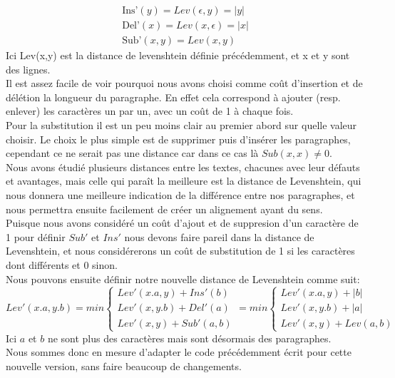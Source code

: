 \documentclass{article}
\begin{document}
\begin{gather*}
	\text{Ins'}(y) = Lev(\epsilon,y) = \lvert y \rvert\\
	\text{Del'}(x) = Lev(x,\epsilon) = \lvert x \rvert\\
	\text{Sub'}(x,y) = Lev(x,y)
\end{gather*}
Ici Lev(x,y) est la distance de levenshtein définie précédemment, et x et y
sont des lignes.\\

Il est assez facile de voir pourquoi nous avons choisi comme coût d'insertion
et de délétion la longueur du paragraphe. En effet cela correspond à ajouter
(resp. enlever) les caractères un par un, avec un coût de 1 à chaque fois.\\

Pour la substitution il est un peu moins clair au premier abord sur quelle
valeur choisir. Le choix le plus simple est de supprimer puis d'insérer les
paragraphes, cependant ce ne serait pas une distance car dans ce cas là
$Sub(x,x) \neq 0$.\\
Nous avons étudié plusieurs distances entre les textes, chacunes avec leur
défauts et avantages, mais celle qui paraît la meilleure est la distance de
Levenshtein, qui nous donnera une meilleure indication de la différence entre
nos paragraphes, et nous permettra ensuite facilement de créer un alignement
ayant du sens.\\
Puisque nous avons considéré un coût d'ajout et de suppresion d'un caractère de
1 pour définir $Sub'$ et $Ins'$ nous devons faire pareil dans la distance de
Levenshtein, et nous considérerons un coût de substitution de 1 si les
caractères dont différents et 0 sinon.\\

Nous pouvons ensuite définir notre nouvelle distance de Levenshtein comme suit:
\begin{equation*}
	Lev'(x.a,y.b)= min
		\begin{cases}
			Lev'(x.a,y) + Ins'(b)\\
			Lev'(x,y.b) + Del'(a)\\
			Lev'(x,y) + Sub'(a,b)
		\end{cases}
		= min
		\begin{cases}
			Lev'(x.a,y) + \lvert b \rvert\\
			Lev'(x,y.b) + \lvert a \rvert\\
			Lev'(x,y) + Lev(a,b)
		\end{cases}
\end{equation*}
Ici $a$ et $b$ ne sont plus des caractères mais sont désormais des
paragraphes.\\
Nous sommes donc en mesure d'adapter le code précédemment écrit pour cette
nouvelle version, sans faire beaucoup de changements.\\
\end{document}
